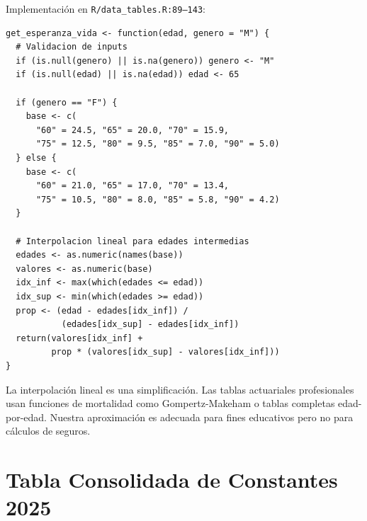 \documentclass[11pt,a4paper]{report}
\begin{document}
\begin{tcolorbox}[colback=orange!5!white, colframe=orange!75!black, title=\textbf{Aplicaci\'on en C\'odigo}]
Implementaci\'on en \texttt{R/data\_tables.R:89--143}:

\begin{lstlisting}
get_esperanza_vida <- function(edad, genero = "M") {
  # Validacion de inputs
  if (is.null(genero) || is.na(genero)) genero <- "M"
  if (is.null(edad) || is.na(edad)) edad <- 65

  if (genero == "F") {
    base <- c(
      "60" = 24.5, "65" = 20.0, "70" = 15.9,
      "75" = 12.5, "80" = 9.5, "85" = 7.0, "90" = 5.0)
  } else {
    base <- c(
      "60" = 21.0, "65" = 17.0, "70" = 13.4,
      "75" = 10.5, "80" = 8.0, "85" = 5.8, "90" = 4.2)
  }

  # Interpolacion lineal para edades intermedias
  edades <- as.numeric(names(base))
  valores <- as.numeric(base)
  idx_inf <- max(which(edades <= edad))
  idx_sup <- min(which(edades >= edad))
  prop <- (edad - edades[idx_inf]) /
           (edades[idx_sup] - edades[idx_inf])
  return(valores[idx_inf] +
         prop * (valores[idx_sup] - valores[idx_inf]))
}
\end{lstlisting}

La interpolaci\'on lineal es una simplificaci\'on. Las tablas actuariales profesionales usan funciones de mortalidad como Gompertz-Makeham o tablas completas edad-por-edad. Nuestra aproximaci\'on es adecuada para fines educativos pero no para c\'alculos de seguros.
\end{tcolorbox}

\section{Tabla Consolidada de Constantes 2025}
\end{document}
